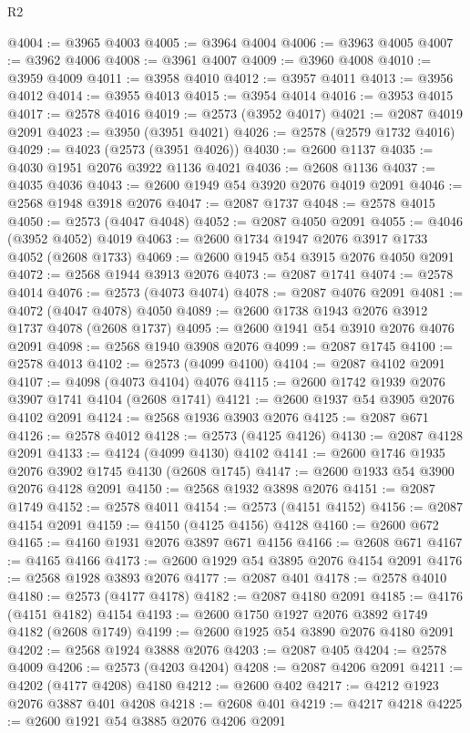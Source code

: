 \begin{lexlean}{R2}
\begin{coremodule}
@4004 := @3965 @4003
@4005 := @3964 @4004
@4006 := @3963 @4005
@4007 := @3962 @4006
@4008 := @3961 @4007
@4009 := @3960 @4008
@4010 := @3959 @4009
@4011 := @3958 @4010
@4012 := @3957 @4011
@4013 := @3956 @4012
@4014 := @3955 @4013
@4015 := @3954 @4014
@4016 := @3953 @4015
@4017 := @2578 @4016
@4019 := @2573 (@3952 @4017)
@4021 := @2087 @4019 @2091
@4023 := @3950 (@3951 @4021)
@4026 := @2578 (@2579 @1732 @4016)
@4029 := @4023 (@2573 (@3951 @4026))
@4030 := @2600 @1137
@4035 := @4030 @1951 @2076 @3922 @1136 @4021
@4036 := @2608 @1136
@4037 := @4035 @4036
@4043 := @2600 @1949 @54 @3920 @2076 @4019 @2091
@4046 := @2568 @1948 @3918 @2076
@4047 := @2087 @1737
@4048 := @2578 @4015
@4050 := @2573 (@4047 @4048)
@4052 := @2087 @4050 @2091
@4055 := @4046 (@3952 @4052) @4019
@4063 := @2600 @1734 @1947 @2076 @3917 @1733 @4052 (@2608 @1733)
@4069 := @2600 @1945 @54 @3915 @2076 @4050 @2091
@4072 := @2568 @1944 @3913 @2076
@4073 := @2087 @1741
@4074 := @2578 @4014
@4076 := @2573 (@4073 @4074)
@4078 := @2087 @4076 @2091
@4081 := @4072 (@4047 @4078) @4050
@4089 := @2600 @1738 @1943 @2076 @3912 @1737 @4078 (@2608 @1737)
@4095 := @2600 @1941 @54 @3910 @2076 @4076 @2091
@4098 := @2568 @1940 @3908 @2076
@4099 := @2087 @1745
@4100 := @2578 @4013
@4102 := @2573 (@4099 @4100)
@4104 := @2087 @4102 @2091
@4107 := @4098 (@4073 @4104) @4076
@4115 := @2600 @1742 @1939 @2076 @3907 @1741 @4104 (@2608 @1741)
@4121 := @2600 @1937 @54 @3905 @2076 @4102 @2091
@4124 := @2568 @1936 @3903 @2076
@4125 := @2087 @671
@4126 := @2578 @4012
@4128 := @2573 (@4125 @4126)
@4130 := @2087 @4128 @2091
@4133 := @4124 (@4099 @4130) @4102
@4141 := @2600 @1746 @1935 @2076 @3902 @1745 @4130 (@2608 @1745)
@4147 := @2600 @1933 @54 @3900 @2076 @4128 @2091
@4150 := @2568 @1932 @3898 @2076
@4151 := @2087 @1749
@4152 := @2578 @4011
@4154 := @2573 (@4151 @4152)
@4156 := @2087 @4154 @2091
@4159 := @4150 (@4125 @4156) @4128
@4160 := @2600 @672
@4165 := @4160 @1931 @2076 @3897 @671 @4156
@4166 := @2608 @671
@4167 := @4165 @4166
@4173 := @2600 @1929 @54 @3895 @2076 @4154 @2091
@4176 := @2568 @1928 @3893 @2076
@4177 := @2087 @401
@4178 := @2578 @4010
@4180 := @2573 (@4177 @4178)
@4182 := @2087 @4180 @2091
@4185 := @4176 (@4151 @4182) @4154
@4193 := @2600 @1750 @1927 @2076 @3892 @1749 @4182 (@2608 @1749)
@4199 := @2600 @1925 @54 @3890 @2076 @4180 @2091
@4202 := @2568 @1924 @3888 @2076
@4203 := @2087 @405
@4204 := @2578 @4009
@4206 := @2573 (@4203 @4204)
@4208 := @2087 @4206 @2091
@4211 := @4202 (@4177 @4208) @4180
@4212 := @2600 @402
@4217 := @4212 @1923 @2076 @3887 @401 @4208
@4218 := @2608 @401
@4219 := @4217 @4218
@4225 := @2600 @1921 @54 @3885 @2076 @4206 @2091

\end{coremodule}
\end{lexlean}

